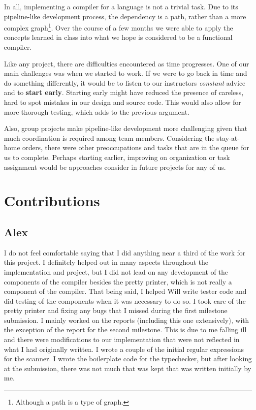 \documentclass{article}
\begin{document}

In all, implementing a compiler for a language is not a trivial task. Due to its pipeline-like development process, the dependency is a path, rather than a more complex graph\footnote{Although a path is a type of graph.}. Over the course of a few months we were able to apply the concepts learned in class into what we hope is considered to be a functional compiler.

Like any project, there are difficulties encountered as time progresses. One of our main challenges was when we started to work. If we were to go back in time and do something differently, it would be to listen to our instructors \textit{constant} advice and to \textbf{start early}. Starting early might have reduced the presence of careless, hard to spot mistakes in our design and source code. This would also allow for more thorough testing, which adds to the previous argument.

Also, group projects make pipeline-like development more challenging given that much coordination is required among team members. Considering the stay-at-home orders, there were other preoccupations and tasks that are in the queue for us to complete. Perhaps starting earlier, improving on organization or task assignment would be approaches consider in future projects for any of us.

\section{Contributions}

\subsection{Alex}

I do not feel comfortable saying that I did anything near a third of the work for this project. I definitely helped out in many aspects throughout the implementation and project, but I did not lead on any development of the components of the compiler besides the pretty printer, which is not really a component of the compiler. That being said, I helped Will write tester code and did testing of the components when it was necessary to do so. I took care of the pretty printer and fixing any bugs that I missed during the first milestone submission. I mainly worked on the reports (including this one extensively), with the exception of the report for the second milestone. This is due to me falling ill and there were modifications to our implementation that were not reflected in what I had originally written. I wrote a couple of the initial regular expressions for the scanner. I wrote the boilerplate code for the typechecker, but after looking at the submission, there was not much that was kept that was written initially by me.
\end{document}
